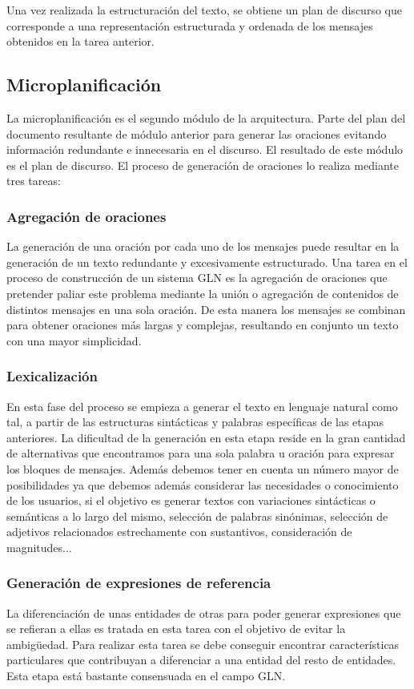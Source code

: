 Una vez realizada la estructuración del texto, se obtiene un plan de discurso que corresponde a una representación estructurada y ordenada de los mensajes obtenidos en la tarea anterior.

\subsection{Microplanificación}
La microplanificación es el segundo módulo de la arquitectura. Parte del plan del documento resultante de módulo anterior para generar las oraciones evitando información redundante e innecesaria en el discurso. El resultado de este módulo es el plan de discurso. El proceso de generación de oraciones lo realiza mediante tres tareas:

\subsubsection{Agregación de oraciones}
La generación de una oración por cada uno de los mensajes puede resultar en la generación de un texto redundante y excesivamente estructurado. Una tarea en el proceso de construcción de un sistema GLN es la agregación de oraciones que pretender paliar este problema mediante la unión o agregación de contenidos de distintos mensajes en una sola oración. De esta manera los mensajes se combinan para obtener oraciones más largas y complejas, resultando en conjunto un texto con una mayor simplicidad.

\subsubsection{Lexicalización}
En esta fase del proceso se empieza a generar el texto en lenguaje natural como tal, a partir de las estructuras sintácticas y palabras específicas de las etapas anteriores. La dificultad de la generación en esta etapa reside en la gran cantidad de alternativas que encontramos para una sola palabra u oración para expresar los bloques de mensajes. Además debemos tener en cuenta un número mayor de posibilidades ya que debemos además considerar las necesidades o conocimiento de los usuarios, si el objetivo es generar textos con variaciones sintácticas o semánticas a lo largo del mismo, selección de palabras sinónimas, selección de adjetivos relacionados estrechamente con sustantivos, consideración de magnitudes... 


\subsubsection{Generación de expresiones de referencia}
La diferenciación de unas entidades de otras para poder generar expresiones que se refieran a ellas es tratada en esta tarea con el objetivo de evitar la ambigüedad. Para realizar esta tarea se debe conseguir encontrar características particulares que contribuyan a diferenciar a una entidad del resto de entidades. Esta etapa está bastante consensuada en el campo GLN. 

